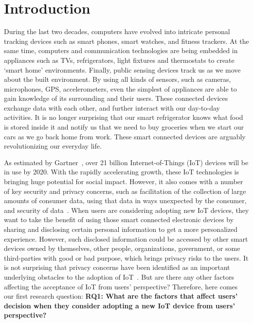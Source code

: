 \chapter{Introduction}\label{chapter:intro}
 
During the last two decades, computers have evolved into intricate personal tracking devices such as smart phones, smart watches, and fitness trackers. At the same time, computers and communication technologies are being embedded in appliances such as TVs, refrigerators, light fixtures and thermostats to create `smart home' environments. Finally, public sensing devices track us as we move about the built environment. By using all kinds of sensors, such as cameras, microphones, GPS, accelerometers, even the simplest of appliances are able to gain knowledge of its surrounding and their users. These connected devices exchange data with each other, and further interact with our day-to-day activities. It is no longer surprising that our smart refrigerator knows what food is stored inside it and notify us that we need to buy groceries when we start our cars as we go back home from work. These smart connected devices are arguably revolutionizing our everyday life.

As estimated by Gartner~\cite{eddy2015gartner}, over 21 billion Internet-of-Things (IoT) devices will be in use by 2020. With the rapidly accelerating growth, these IoT technologies is bringing huge potential for social impact. However, it also comes with a number of key security and privacy concerns, such as facilitation of the collection of large amounts of consumer data, using that data in ways unexpected by the consumer, and security of data~\cite{lu2014overview, yu2015handling}.  When users are considering adopting new IoT devices, they want to take the benefit of using those smart connected electronic devices by sharing and disclosing certain personal information to get a more personalized experience. However, such disclosed information could be accessed by other smart devices owned by themselves, other people, organizations, government, or some third-parties with good or bad purpose, which brings privacy risks to the users. It is not surprising that privacy concerns have been identified as an important underlying obstacles to the adoption of IoT~\cite{pricewaterhousecoopers_smart_nodate}. But are there any other factors affecting the acceptance of IoT from users' perspective? Therefore, here comes our first research question: \textbf{RQ1: What are the factors that affect users’ decision when they consider adopting a new IoT device from users' perspective?}

